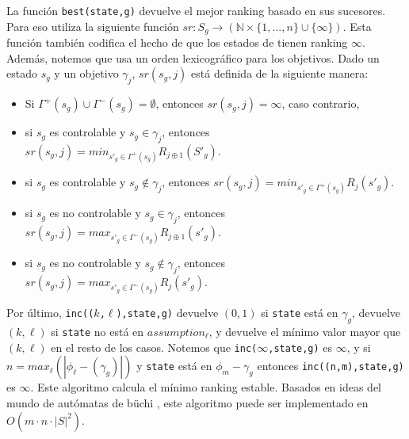 La función \texttt{best(state,g)} devuelve el mejor ranking basado en sus sucesores. Para eso utiliza la siguiente
función $sr : S_g \rightarrow (\mathbb{N} \times \{1,...,n\} \cup \{\infty\})$. Esta función también codifica el hecho
de que los estados de  tienen ranking $\infty$. Además, notemos que usa un orden lexicográfico para los
objetivos. Dado un estado $s_g$ y un objetivo $\gamma_j$, $sr(s_g,j)$ está definida de la siguiente manera:

\begin{itemize}
\item Si $\Gamma^+(s_g) \cup \Gamma^-(s_g) = \emptyset$, entonces $sr(s_g,j) = \infty$, caso contrario,
\item si $s_g$ es controlable y $s_g \in \gamma_j$, entonces $sr(s_g,j) = min_{s'_g \in \Gamma^+(s_g)} R_{j \oplus
1}(S'_g)$.
\item si $s_g$ es controlable y $s_g \notin \gamma_j$, entonces $sr(s_g,j) = min_{s'_g \in \Gamma^+(s_g)} R_j(s'_g)$.
\item si $s_g$ es no controlable y $s_g \in \gamma_j$, entonces $sr(s_g,j) = max_{s'_g \in \Gamma^-(s_g)} R_{j \oplus
1}(s'_g)$.
\item si $s_g$ es no controlable y $s_g \notin \gamma_j$, entonces $sr(s_g,j) = max_{s'_g \in \Gamma^-(s_g)} R_j(s'_g)$.
\end{itemize}

Por último, \texttt{inc(($k$,$\ell$),state,g)} devuelve $(0,1)$ si \texttt{state} está en $\gamma_g$, devuelve $(k,\ell)$ si
\texttt{state} no está en \texttt{$assumption_\ell$}, y devuelve el mínimo valor mayor que $(k,\ell)$ en el resto de los
casos. Notemos que \texttt{inc($\infty$,state,g)} es $\infty$, y si $n = max_\ell(|\phi_\ell-(\gamma_g)|)$ y
\texttt{state} está en $\phi_m-\gamma_g$ entonces \texttt{inc((n,m),state,g)} es $\infty$. Este algoritmo calcula el
mínimo ranking estable. Basados en ideas del mundo de autómatas de büchi \cite{doi:10.1137/S0097539703420675,
PitermanAndJuvekar}, este algoritmo puede ser implementado
en $O(m \cdot n \cdot |S|^2)$.
